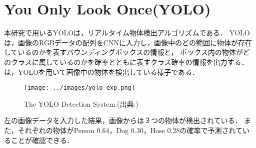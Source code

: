 \documentclass[../main]{subfiles}
\begin{document}
        \newpage

        \section{You Only Look Once(YOLO)}
        本研究で用いるYOLO\cite{yolo_paper_v1}\cite{yolo_paper_v2}\cite{yolo_paper_v3}\cite{yolo_paper_v4}は，リアルタイム物体検出アルゴリズムである．
        YOLOは，画像のRGBデータの配列をCNNに入力し，画像中のどの範囲に物体が存在しているのかを表すバウンディングボックスの情報と，
        ボックス内の物体がどのクラスに属しているのかを確率とともに表すクラス確率の情報を出力する．
        は，YOLOを用いて画像中の物体を検出している様子である． 

        \begin{figure}[H]
        \centering
        \texttt{[image: ../images/yolo\_exp.png]}
        \caption{The YOLO Detection System.(出典:\cite{yolo_paper_v1})}
        \label{figure::yolo_exp}
        \end{figure}
        左の画像データを入力した結果，画像からは３つの物体が検出されている．
        また，それぞれの物体がPerson 0.64，Dog 0.30，Hose 0.28の確率で予測されていることが確認できる．
    
\end{document}
